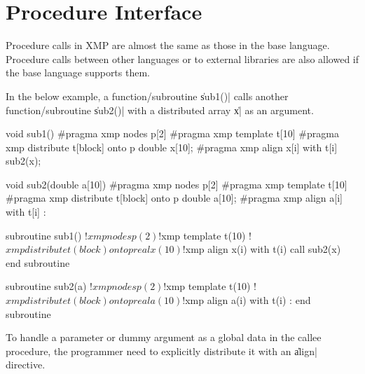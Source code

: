 \section{Procedure Interface}

Procedure calls in XMP are almost the same as those in the base language.
%
Procedure calls between other languages or to external libraries
are also allowed if the base language supports them. 

In the below example, a function/subroutine \|sub1()| calls another
function/subroutine \|sub2()| with a distributed array \|x| as an
argument.

\begin{XCexample}
void sub1(){
#pragma xmp nodes p[2]
#pragma xmp template t[10]
#pragma xmp distribute t[block] onto p
  double x[10];
#pragma xmp align x[i] with t[i]
  sub2(x);
}

void sub2(double a[10]){
#pragma xmp nodes p[2]
#pragma xmp template t[10]
#pragma xmp distribute t[block] onto p
  double a[10];
#pragma xmp align a[i] with t[i]
  :
}
\end{XCexample}

\begin{XFexample}
subroutine sub1()
!$xmp nodes p(2)
!$xmp template t(10)
!$xmp distribute t(block) onto p
  real x(10)
!$xmp align x(i) with t(i)
  call sub2(x)
end subroutine

subroutine sub2(a)
!$xmp nodes p(2)
!$xmp template t(10)
!$xmp distribute t(block) onto p
  real a(10)
!$xmp align a(i) with t(i)
  :
end subroutine
\end{XFexample}


To handle a parameter or dummy argument as a global data in the
callee procedure, the programmer need to explicitly distribute it with
an \|align| directive.

